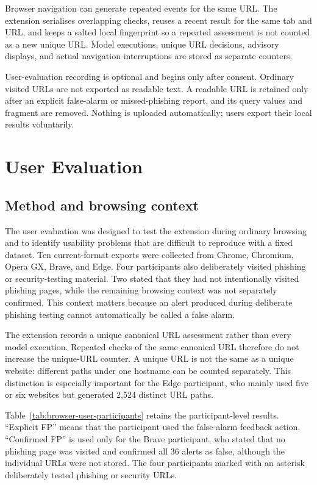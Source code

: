 Browser navigation can generate repeated events for the same URL. The
extension serialises overlapping checks, reuses a recent result for the same
tab and URL, and keeps a salted local fingerprint so a repeated assessment is
not counted as a new unique URL. Model executions, unique URL decisions,
advisory displays, and actual navigation interruptions are stored as separate
counters.

User-evaluation recording is optional and begins only after consent. Ordinary
visited URLs are not exported as readable text. A readable URL is retained
only after an explicit false-alarm or missed-phishing report, and its query
values and fragment are removed. Nothing is uploaded automatically; users
export their local results voluntarily.

\section{User Evaluation}

\subsection{Method and browsing context}

The user evaluation was designed to test the extension during ordinary
browsing and to identify usability problems that are difficult to reproduce
with a fixed dataset. Ten current-format exports were collected from Chrome,
Chromium, Opera GX, Brave, and Edge. Four participants also deliberately
visited phishing or security-testing material. Two stated that they had not
intentionally visited phishing pages, while the remaining browsing context was
not separately confirmed. This context matters because an alert produced
during deliberate phishing testing cannot automatically be called a false
alarm.

The extension records a unique canonical URL assessment rather than every
model execution. Repeated checks of the same canonical URL therefore do not
increase the unique-URL counter. A unique URL is not the same as a unique
website: different paths under one hostname can be counted separately. This
distinction is especially important for the Edge participant, who mainly used
five or six websites but generated 2,524 distinct URL paths.

Table~\ref{tab:browser-user-participants} retains the participant-level
results. ``Explicit FP'' means that the participant used the false-alarm
feedback action. ``Confirmed FP'' is used only for the Brave participant, who
stated that no phishing page was visited and confirmed all 36 alerts as false,
although the individual URLs were not stored. The four participants marked
with an asterisk deliberately tested phishing or security URLs.

